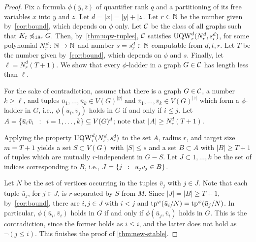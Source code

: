 \begin{proof}%
Fix a formula $\phi(\bar y,\bar z)$ of quantifier rank $q$ and
a partitioning of its 
free variables $\bar x$ into  $\bar y$ and $\bar z$.
Let $d=|\bar x|=|\bar y|+|\bar z|$.
Let $r\in \N$ be the number given by~\cref{cor:bound},
which depends on $\phi$ only.
Let $\cal C$ be the class of all graphs 
such that  $K_t\not\minor_{18r} G$.
Then, by~\cref{thm:uqw-tuples}, 
$\cal C$ satisfies $\uqw^d_{r}(N^d_{r},s^d_r)$,
for some  polynomial  $N^d_r\from\N\to\N$ and number $s=s^d_r\in \N$ computable from $d,t,r$.
Let $T$ be the number given by~\cref{cor:bound},
which depends on $\phi$ and $s$.
 Finally, let 
$\ell=N^d_r(T+1)$.
We show that 
every $\phi$-ladder in a graph $G\in\cal C$ has length less than $\ell$.


For the sake of contradiction, assume that there is a graph $G\in\cal C$, a number $k\ge  \ell$,
and tuples $\bar u_1,\ldots,\bar u_k\in V(G)^{|\bar y|}$ and $ \bar v_1,\ldots, \bar v_k\in V(G)^{|\bar z|}$
which form a $\phi$-ladder in $G$, i.e., 
$\phi(\bar u_i,\bar v_j)$ holds in $G$ if and only if $i\le j$.
	Let $A=\setof{ \bar u_i \bar v_i}{i=1,\ldots,k}\subset V(G)^d$; note that $|A|\ge N^d_r(T+1)$.
  
Applying the property  $\uqw^d_r(N^d_r,s^d_r)$ to the set $A$, radius $r$, and target size $m=T+1$
		 yields a set $S\subset V(G)$ with $|S|\le s$
	and a set $B\subset A$ with $|B|\geq T+1$ 
  of tuples which are  mutually $r$-independent  in $G-S$.
  Let $J\subset {1,\ldots,k}$
  be the set of indices corresponding to $B$,
  i.e., $J=\setof{j}{\bar u_j\bar v_j\in B}$.
  
  

  
  
		Let
    $N$
    be the set of vertices occurring in   the  tuples $\bar v_j$ with $j\in J$. Note that each tuple $\bar u_j$, for $j\in J$, is $r$-separated by $S$ from $M$.    
    Since $|J|=|B|\geq T+1$, by~\cref{cor:bound}, there are 
    $i,j\in J$ with $i<j$ and $\tp^\phi(\bar u_i/N)=
    \tp^\phi(\bar u_j/N)$.
    In particular, $\phi(\bar u_i,\bar v_i)$ holds in $G$
    if and only if $\phi(\bar u_j,\bar v_i)$ holds in $G$.
    This is the contradiction, since the former  holds as $i\le i$, and the latter does not hold as $\neg (j\le i)$.
This finishes the proof of \cref{thm:new-stable}.
\end{proof}





